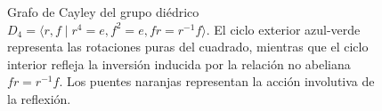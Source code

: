 \documentclass{article}
\begin{document}
\begin{figure}[htbp]
\caption{Grafo de Cayley del grupo diédrico $D_4 = \langle r, f \mid r^4 = e, f^2 = e, fr = r^{-1}f \rangle$. El ciclo exterior azul-verde representa las rotaciones puras del cuadrado, mientras que el ciclo interior refleja la inversión inducida por la relación no abeliana $fr=r^{-1}f$. Los puentes naranjas representan la acción involutiva de la reflexión.}
\label{fig:cayley_d4}
\end{figure}
\end{document}
